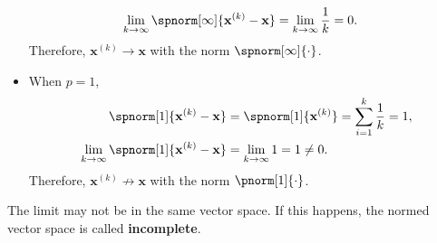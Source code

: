 \documentclass{huhtakm-template-book-v2}
\begin{document}
\begin{eg}
\begin{itemize}
\begin{align*}
                \lim_{k \to \infty}\spnorm[\infty]{\mathbf{x}^{(k)} - \mathbf{x}} &= \lim_{k \to \infty}\frac{1}{k} = 0.
            \end{align*}
            Therefore, $\mathbf{x}^{(k)} \to \mathbf{x}$ with the norm $\spnorm[\infty]{\cdot}$.
            \item[] When $p = 1$,
            \begin{align*}
                \spnorm[1]{\mathbf{x}^{(k)} - \mathbf{x}} &= \spnorm[1]{\mathbf{x}^{(k)}} = \sum_{i=1}^{k}\frac{1}{k} = 1,\\
                \lim_{k \to \infty}\spnorm[1]{\mathbf{x}^{(k)} - \mathbf{x}} &= \lim_{k \to \infty}1 = 1 \neq 0.
            \end{align*}
            Therefore, $\mathbf{x}^{(k)} \not\to \mathbf{x}$ with the norm $\pnorm[1]{\cdot}$.
        \end{itemize}
    \end{eg}
    \begin{rem}
        The limit may not be in the same vector space. If this happens, the normed vector space is called \textbf{incomplete}.
    \end{rem}
\end{document}
